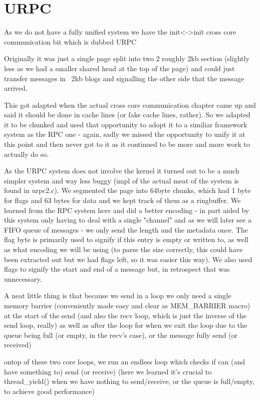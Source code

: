 \section{URPC}\label{s:URPC}
As we do not have a fully unified system we have the init<->init cross core communication bit which is dubbed URPC

Originally it was just a single page split into two 2 roughly 2kb section (slightly less as we had a smaller shared head at the top of the page) and could just transfer messages in ~2kb blogs and signalling the other side that the message arrived.

This got adapted when the actual cross core communication chapter came up and said it should be done in cache lines (or fake cache lines, rather). So we adapted it to be chunked and used that opportunity to adopt it to a similiar framework system as the RPC one - again, sadly we missed the opportunity to unify it at this point and then never got to it as it continued to be more and more work to actually do so.

As the URPC system does not involve the kernel it turned out to be a much simpler system and way less buggy (impl of the actual meat of the system is found in urpc2.c). We segmented the page into 64byte chunks, which had 1 byte for flags and 63 bytes for data and we kept track of them as a ringbuffer. We learned from the RPC system here and did a better encoding - in part aided by this system only having to deal with a single "channel" and as we will later see a FIFO queue of messages - we only send the length and the metadata once. The flag byte is primarily used to signify if this entry is empty or written to, as well as what encoding we will be using (to parse the size correctly, this could have been extracted out but we had flags left, so it was easier this way). We also used flags to signify the start and end of a message but, in retrospect that was unnecessary.

A neat little thing is that because we send in a loop we only need a single memory barrier (conveniently made easy and clear as MEM\_BARRIER macro) at the start of the send (and also the recv loop, which is just the inverse of the send loop, really) as well as after the loop for when we exit the loop due to the queue being full (or empty, in the recv's case), or the message fully send (or received)

ontop of these two core loops, we run an endless loop which checks if can (and have something to) send (or receive) (here we learned it's crucial to thread\_yield() when we have nothing to send/receive, or the queue is full/empty, to achieve good performance)

